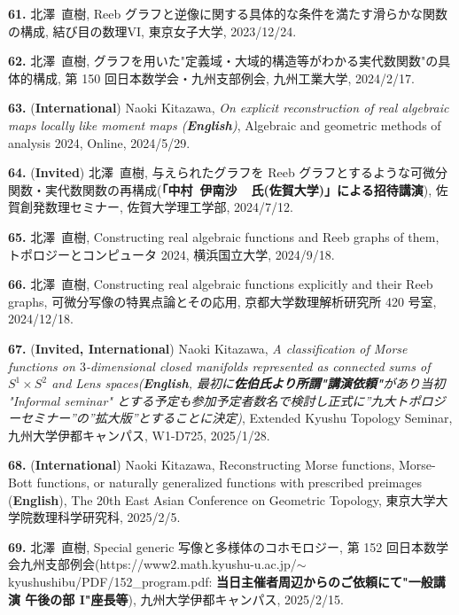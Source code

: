 \documentclass{article}
\begin{document}
\par\noindent
{\bf 61.} 北澤\ 直樹,  Reeb グラフと逆像に関する具体的な条件を満たす滑らかな関数の構成, 結び目の数理VI, 東京女子大学, 2023/12/24.

\par\noindent
{\bf 62.} 北澤\ 直樹, グラフを用いた"定義域・大域的構造等がわかる実代数関数"の具体的構成, 第 150 回日本数学会・九州支部例会, 九州工業大学, 2024/2/17. 

\par\noindent
{\bf 63.} ({\bf International}) Naoki Kitazawa, \textsl{On explicit reconstruction of real algebraic maps locally like moment maps ({\bf English})}, Algebraic and geometric methods of analysis 2024, Online, 2024/5/29. 

\par\noindent
{\bf 64.} ({\bf  Invited}) 北澤\ 直樹, 与えられたグラフを Reeb グラフとするような可微分関数・実代数関数の再構成({\bf 「中村\ 伊南沙\ \ 氏(佐賀大学)」による招待講演}), 佐賀創発数理セミナー, 佐賀大学理工学部, 2024/7/12.

\par\noindent
{\bf 65.} 北澤\ 直樹, Constructing real algebraic functions and Reeb graphs of them, トポロジーとコンピュータ 2024, 横浜国立大学, 2024/9/18.

\par\noindent
{\bf 66.}
北澤\ 直樹, Constructing real algebraic functions explicitly and their Reeb graphs, 可微分写像の特異点論とその応用, 京都大学数理解析研究所 420 号室, 2024/12/18. 

\par\noindent
{\bf 67.} ({\bf  Invited, International})
Naoki Kitazawa, \textsl{A classification of Morse functions on $3$-dimensional closed manifolds represented as connected sums of $S^1 \times S^2$ and Lens spaces{\rm (}{\bf English}, 最初に{\bf 佐伯氏より所謂"講演依頼"}があり当初 "{\rm Informal seminar}" とする予定も参加予定者数名で検討し正式に”九大トポロジーセミナー”の”拡大版”とすることに決定{\rm )}}, Extended Kyushu Topology Seminar, 九州大学伊都キャンパス, W1-D725, 2025/1/28.

\par\noindent
{\bf 68.} ({\bf  International})  
Naoki Kitazawa, Reconstructing Morse functions, Morse-Bott functions, or naturally generalized functions with prescribed preimages
({\bf English}), The 20th East Asian Conference on Geometric Topology, 東京大学大学院数理科学研究科, 2025/2/5.

\par\noindent
{\bf 69.}  北澤\ 直樹, Special generic 写像と多様体のコホモロジー, 第 152 回日本数学会九州支部例会(https://www2.math.kyushu-u.ac.jp/$\sim$kyushushibu/PDF/152\_program.pdf: {\bf 当日主催者周辺からのご依頼にて"一般講演 午後の部 I"座長等}), 九州大学伊都キャンパス, 2025/2/15.
\end{document}
